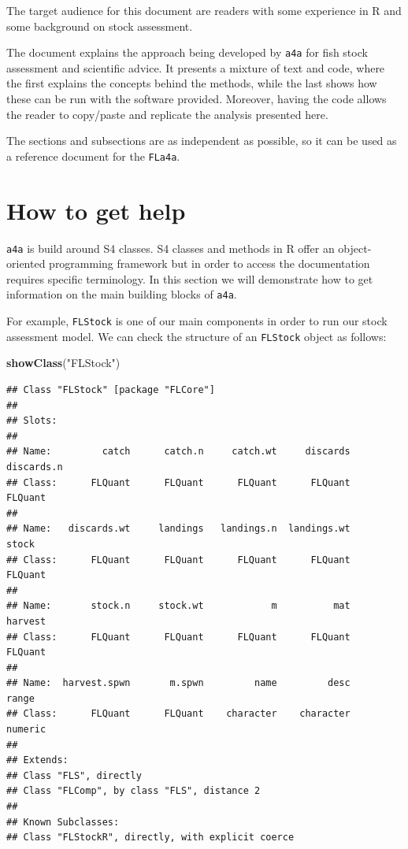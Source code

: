\documentclass[
]{book}
\newenvironment{Shaded}{\begin{snugshade}}{\end{snugshade}}
\newcommand{\FunctionTok}[1]{\textcolor[rgb]{0.13,0.29,0.53}{\textbf{#1}}}
\newcommand{\NormalTok}[1]{#1}
\newcommand{\StringTok}[1]{\textcolor[rgb]{0.31,0.60,0.02}{#1}}
\begin{document}
The target audience for this document are readers with some experience in R and some background on stock assessment.

The document explains the approach being developed by \texttt{a4a} for fish stock assessment and scientific advice. It presents a mixture of text and code, where the first explains the concepts behind the methods, while the last shows how these can be run with the software provided. Moreover, having the code allows the reader to copy/paste and replicate the analysis presented here.

The sections and subsections are as independent as possible, so it can be used as a reference document for the \texttt{FLa4a}.

\hypertarget{how-to-get-help}{%
\section{How to get help}\label{how-to-get-help}}

\texttt{a4a} is build around S4 classes. S4 classes and methods in R offer an object-oriented programming framework but in order to access the documentation requires specific terminology. In this section we will demonstrate how to get information on the main building blocks of \texttt{a4a}.

For example, \texttt{FLStock} is one of our main components in order to run our stock assessment model. We can check the structure of an \texttt{FLStock} object as follows:

\begin{Shaded}
\begin{Highlighting}[]
\FunctionTok{showClass}\NormalTok{(}\StringTok{"FLStock"}\NormalTok{)}
\end{Highlighting}
\end{Shaded}

\begin{verbatim}
## Class "FLStock" [package "FLCore"]
## 
## Slots:
##                                                                        
## Name:         catch      catch.n     catch.wt     discards   discards.n
## Class:      FLQuant      FLQuant      FLQuant      FLQuant      FLQuant
##                                                                        
## Name:   discards.wt     landings   landings.n  landings.wt        stock
## Class:      FLQuant      FLQuant      FLQuant      FLQuant      FLQuant
##                                                                        
## Name:       stock.n     stock.wt            m          mat      harvest
## Class:      FLQuant      FLQuant      FLQuant      FLQuant      FLQuant
##                                                                        
## Name:  harvest.spwn       m.spwn         name         desc        range
## Class:      FLQuant      FLQuant    character    character      numeric
## 
## Extends: 
## Class "FLS", directly
## Class "FLComp", by class "FLS", distance 2
## 
## Known Subclasses: 
## Class "FLStockR", directly, with explicit coerce
\end{verbatim}
\end{document}
